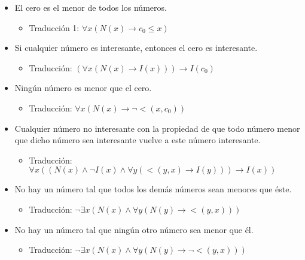 \begin{solution}
    \begin{itemize}
    \item El cero es el menor de todos los números.
    \begin{itemize}
        \item Traducción 1: \( \forall x (N(x) \rightarrow c_0 \leq x) \)
    \end{itemize}
    
    \item Si cualquier número es interesante, entonces el cero es interesante.
    \begin{itemize}
        \item Traducción: \( (\forall x (N(x) \rightarrow I(x))) \rightarrow I(c_0) \)
    \end{itemize}
    
    \item Ningún número es menor que el cero.
    \begin{itemize}
        \item Traducción: \( \forall x (N(x) \rightarrow \neg <(x, c_0)) \)
    \end{itemize}
    
    \item Cualquier número no interesante con la propiedad de que todo número menor que dicho número sea interesante vuelve a este número interesante.
    \begin{itemize}
        \item Traducción: \( \forall x ((N(x) \land \neg I(x) \land \forall y (<(y, x) \rightarrow I(y))) \rightarrow I(x)) \)
    \end{itemize}
    
    \item No hay un número tal que todos los demás números sean menores que éste.
    \begin{itemize}
        \item Traducción: \( \neg \exists x (N(x) \land \forall y (N(y) \rightarrow <(y, x))) \)
    \end{itemize}
    
    \item No hay un número tal que ningún otro número sea menor que él.
    \begin{itemize}
        \item Traducción: \( \neg \exists x (N(x) \land \forall y (N(y) \rightarrow \neg <(y, x))) \)
    \end{itemize}
\end{itemize}

\end{solution}